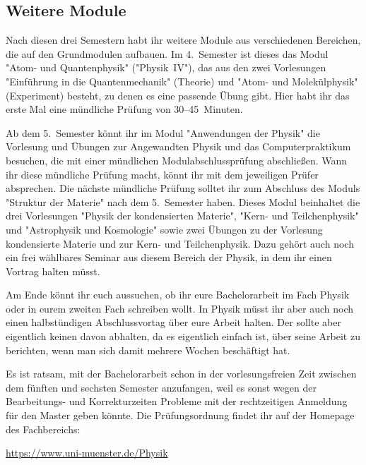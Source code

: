 \begin{multicols*}{2}
\subsection*{Weitere Module}
Nach diesen drei Semestern habt ihr weitere Module aus verschiedenen Bereichen, die auf den Grundmodulen aufbauen. Im 4.~Semester ist dieses das Modul "Atom- und Quantenphysik" ("Physik~IV"), das aus den zwei Vorlesungen "Einführung in die Quantenmechanik" (Theorie) und "Atom- und Molekülphysik" (Experiment) besteht, zu denen es eine passende Übung gibt. Hier habt ihr das erste Mal eine mündliche Prüfung von 30--45~Minuten.

Ab dem 5.~Semester könnt ihr im Modul "Anwendungen der Physik" die Vorlesung und Übungen zur Angewandten Physik und das Computerpraktikum besuchen, die mit einer mündlichen Modulabschlussprüfung abschließen. Wann ihr diese mündliche Prüfung macht, könnt ihr mit dem jeweiligen Prüfer absprechen. Die nächste mündliche Prüfung solltet ihr zum Abschluss des Moduls "Struktur der Materie" nach dem 5.~Semester haben. Dieses Modul beinhaltet die drei Vorlesungen "Physik der kondensierten Materie", "Kern- und Teilchenphysik" und "Astrophysik und Kosmologie" sowie zwei Übungen zu der Vorlesung kondensierte Materie und zur Kern- und Teilchenphysik. Dazu gehört auch noch ein frei wählbares Seminar aus diesem Bereich der Physik, in dem ihr einen Vortrag halten müsst.

Am Ende könnt ihr euch aussuchen, ob ihr eure Bachelorarbeit im Fach Physik oder in eurem zweiten Fach schreiben wollt. In Physik müsst ihr aber auch noch einen halbstündigen Abschlussvortag über eure Arbeit halten. Der sollte aber eigentlich keinen davon abhalten, da es eigentlich einfach ist, über seine Arbeit zu berichten, wenn man sich damit mehrere Wochen beschäftigt hat.

Es ist ratsam, mit der Bachelorarbeit schon in der vorlesungsfreien Zeit zwischen dem fünften und sechsten Semester anzufangen, weil es sonst wegen der Bearbeitungs- und Korrekturzeiten Probleme mit der rechtzeitigen Anmeldung für den Master geben könnte. Die Prüfungsordnung findet ihr auf der Homepage des Fachbereichs:
\begin{center}
\url{https://www.uni-muenster.de/Physik}
\end{center}


\end{multicols*}
